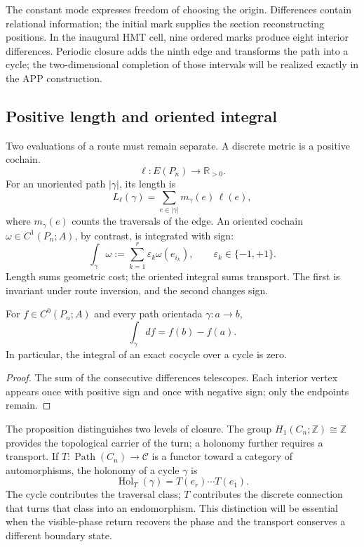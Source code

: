The constant mode expresses freedom of choosing the origin. Differences
contain relational information; the initial mark supplies the section
reconstructing positions. In the inaugural HMT cell, nine ordered marks
produce eight interior differences. Periodic closure adds the ninth
edge and transforms the path into a cycle; the two-dimensional completion
of those intervals will be realized exactly in the APP construction.

\subsection{Positive length and oriented integral}

Two evaluations of a route must remain separate. A discrete metric is a positive cochain.
\[
 \ell:E(P_n)\longrightarrow\mathbb R_{>0}.
\]
For an unoriented path \(|\gamma|\), its length is
\begin{equation}
 L_\ell(\gamma)=\sum_{e\in|\gamma|}m_\gamma(e)\,\ell(e),
 \label{eq:longitud-positiva-camino-rev2}
\end{equation}
where \(m_\gamma(e)\) counts the traversals of the edge. An oriented
cochain \(\omega\in C^1(P_n;A)\), by contrast, is integrated with sign:
\begin{equation}
 \int_\gamma\omega
 :=\sum_{k=1}^{r}\varepsilon_k\omega(e_{i_k}),
 \qquad \varepsilon_k\in\{-1,+1\}.
 \label{eq:integral-cocadena-camino-rev2}
\end{equation}
Length sums geometric cost; the oriented integral sums transport. The
first is invariant under route inversion, and the second changes sign.

\begin{proposition}
\label{prop:teorema-fundamental-discreto-rev2}
For \(f\in C^0(P_n;A)\) and every path orientada \(\gamma:a\to b\),
\[
 \int_\gamma df=f(b)-f(a).
\]
In particular, the integral of an exact cocycle over a cycle is zero.
\end{proposition}

\begin{proof}
The sum of the consecutive differences telescopes. Each interior vertex
appears once with positive sign and once with negative sign; only
the endpoints remain.
\end{proof}

The proposition distinguishes two levels of closure. The group
\(H_1(C_n;\mathbb Z)\cong\mathbb Z\) provides the topological carrier of the
turn; a holonomy further requires a transport. If
\(T:\operatorname{Path}(C_n)\to\mathcal C\) is a functor toward a category
of automorphisms, the holonomy of a cycle \(\gamma\) is
\begin{equation}
 \operatorname{Hol}_T(\gamma)=T(e_r)\cdots T(e_1).
 \label{eq:holonomia-transporte-ciclo-rev2}
\end{equation}
The cycle contributes the traversal class; \(T\) contributes the discrete connection that
turns that class into an endomorphism. This distinction will be essential when
the visible-phase return recovers the phase and the transport conserves a different
boundary state.

